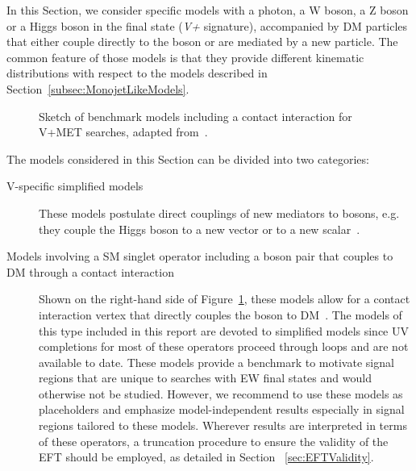 
In this Section, we consider specific models with a photon, a W boson, a Z boson or a Higgs boson in the final state (\textit{V+\MET} signature), accompanied by DM particles that either couple directly to the boson or are mediated by a new particle. The common feature of those models is that they provide different kinematic distributions with respect to the models described in Section~\ref{subsec:MonojetLikeModels}.


\begin{figure}[h!]
	\centering
	\vspace{\baselineskip}
	\textwidth

	\begin{feynmandiagram}[modelVeft5pt]
	\end{feynmandiagram}
	
	\vspace{\baselineskip}
	\caption{Sketch of benchmark models including a contact interaction
		for V+MET searches, adapted from~\cite{Nelson:2013pqa}. \label{fig:VPlusMET_EFT}}
\end{figure}

The models considered in this Section can be divided into two categories:
\begin{description}
	\item[V-specific simplified models] These models postulate direct couplings of new mediators
	to bosons, e.g. they couple the Higgs boson to a new vector or to a new scalar~\cite{Carpenter:2013xra,Berlin:2014cfa}. 
	\item[Models involving a SM singlet operator including a boson pair that couples to DM through a contact interaction]
	Shown on the right-hand side of Figure~\ref{fig:VPlusMET_EFT},
	these models allow for a contact interaction vertex that directly couples the boson to DM~\cite{Cotta:2012nj, Carpenter:2012rg, Crivellin:2015wva,Berlin:2014cfa}.
	The models of this type included in this report are devoted to simplified models since 
	UV completions for most of these operators proceed through loops and are not available to date. 
	These models provide a benchmark to motivate signal regions that are unique to searches with
	EW final states and would otherwise not be studied. However, we recommend to use these models
	as placeholders and emphasize model-independent results especially in signal regions tailored to these models. 
	Wherever results are interpreted in terms of these operators, a truncation procedure
	to ensure the validity of the EFT should be employed, as detailed in Section ~\ref{sec:EFTValidity}. 
\end{description}


